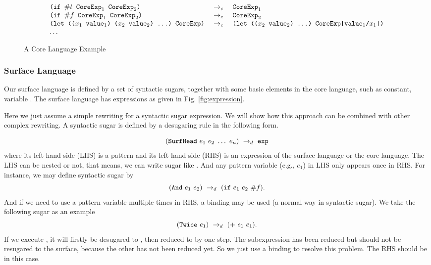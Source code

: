 \begin{figure*}[thb]
\begin{centering}
{\[{\begin{array}{lcl}
		\texttt{(if~$\#t$~$\mbox{\tt CoreExp}_1$~$\mbox{\tt CoreExp}_2$)}&~\rightarrow_c~& \texttt{$\mbox{\tt CoreExp}_1$}\\
		\texttt{(if~$\#f$~$\mbox{\tt CoreExp}_1$~$\mbox{\tt CoreExp}_2$)}&~\rightarrow_c~& \texttt{$\mbox{\tt CoreExp}_2$}\\
		\texttt{(let~(($x_1$~$\mbox{\tt value}_1$)~($x_2$~$\mbox{\tt value}_2$)~...)~CoreExp)}&~\rightarrow_c~&\texttt{(let~(($x_2$~$\mbox{\tt value}_2$)~...)~CoreExp[$\mbox{\tt value}_1$/$x_1$])}\\
		\ldots&&
		\end{array}
}
\]
}



\end{centering}
\caption{A Core Language Example}
\label{fig:core}
\end{figure*}




\subsubsection{Surface Language}

Our surface language is defined by a set of syntactic sugars, together with some basic elements in the core language, such as constant, variable . The surface language has expressions as given in Fig.  \ref{fig:expression}. 

Here we just assume a simple rewriting for a syntactic sugar expression. We will show how this approach can be combined with other complex rewriting. A syntactic sugar is defined by a desugaring rule in the following form.

\[
(\mbox{\tt SurfHead}~e_1~e_2~\ldots~e_n) ~\rightarrow_d~ \mbox{\tt exp}
\]
where its left-hand-side (LHS) is a pattern and its left-hand-side (RHS) is an expression of the surface language or the core language. The LHS can be nested or not, that means, we can write sugar  like . And any pattern variable (e.g., $e_1$) in LHS only appears once in RHS. For instance, we may define syntactic sugar  by
\[
(\mbox{\tt And}~e_1~e_2) ~\rightarrow_d~ (\mbox{\tt if}~e_1~e_2~\#f).
\]
And if we need to use a pattern variable multiple times in RHS, a  binding may be used (a normal way in syntactic sugar). We take the following sugar as an example
\[
(\mbox{\tt Twice}~e_1) ~\rightarrow_d~ (+~e_1~e_1).
\]
If we execute , it will firstly  be desugared to , then reduced to  by one step. The subexpression  has been reduced but should not be resugared to the surface, because the other  has not been reduced yet.
So we just use a  binding to resolve this problem. The RHS should be  in this case.


